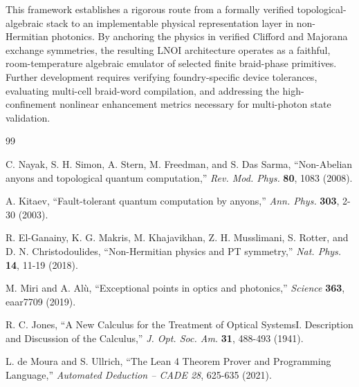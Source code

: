\documentclass[aps,prl,twocolumn,superscriptaddress,amsmath,amssymb]{revtex4-2}
\begin{document}
This framework establishes a rigorous route from a formally verified topological-algebraic stack to an implementable physical representation layer in non-Hermitian photonics. By anchoring the physics in verified Clifford and Majorana exchange symmetries, the resulting LNOI architecture operates as a faithful, room-temperature algebraic emulator of selected finite braid-phase primitives. Further development requires verifying foundry-specific device tolerances, evaluating multi-cell braid-word compilation, and addressing the high-confinement nonlinear enhancement metrics necessary for multi-photon state validation.

\begin{thebibliography}{99}

C. Nayak, S. H. Simon, A. Stern, M. Freedman, and S. Das Sarma, 
``Non-Abelian anyons and topological quantum computation,'' 
\textit{Rev. Mod. Phys.} \textbf{80}, 1083 (2008).

A. Kitaev, 
``Fault-tolerant quantum computation by anyons,'' 
\textit{Ann. Phys.} \textbf{303}, 2-30 (2003).

R. El-Ganainy, K. G. Makris, M. Khajavikhan, Z. H. Musslimani, S. Rotter, and D. N. Christodoulides, 
``Non-Hermitian physics and PT symmetry,'' 
\textit{Nat. Phys.} \textbf{14}, 11-19 (2018).

M. Miri and A. Alù, 
``Exceptional points in optics and photonics,'' 
\textit{Science} \textbf{363}, eaar7709 (2019).

R. C. Jones, 
``A New Calculus for the Treatment of Optical SystemsI. Description and Discussion of the Calculus,'' 
\textit{J. Opt. Soc. Am.} \textbf{31}, 488-493 (1941).

L. de Moura and S. Ullrich, 
``The Lean 4 Theorem Prover and Programming Language,'' 
\textit{Automated Deduction -- CADE 28}, 625-635 (2021).

\end{thebibliography}
\end{document}
